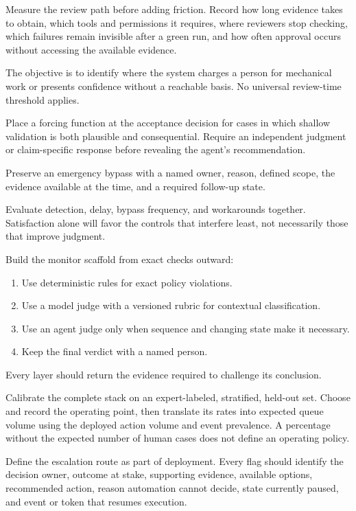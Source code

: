 Measure the review path before adding friction. Record how long evidence takes to obtain, which tools and permissions it requires, where reviewers stop checking, which failures remain invisible after a green run, and how often approval occurs without accessing the available evidence.

The objective is to identify where the system charges a person for mechanical work or presents confidence without a reachable basis. No universal review-time threshold applies.

Place a forcing function at the acceptance decision for cases in which shallow validation is both plausible and consequential. Require an independent judgment or claim-specific response before revealing the agent's recommendation.

Preserve an emergency bypass with a named owner, reason, defined scope, the evidence available at the time, and a required follow-up state.

Evaluate detection, delay, bypass frequency, and workarounds together. Satisfaction alone will favor the controls that interfere least, not necessarily those that improve judgment.


Build the monitor scaffold from exact checks outward:

\begin{enumerate}
\def\labelenumi{\arabic{enumi}.}
\tightlist
\item
  Use deterministic rules for exact policy violations.
\item
  Use a model judge with a versioned rubric for contextual classification.
\item
  Use an agent judge only when sequence and changing state make it necessary.
\item
  Keep the final verdict with a named person.
\end{enumerate}

Every layer should return the evidence required to challenge its conclusion.

Calibrate the complete stack on an expert-labeled, stratified, held-out set. Choose and record the operating point, then translate its rates into expected queue volume using the deployed action volume and event prevalence. A percentage without the expected number of human cases does not define an operating policy.

Define the escalation route as part of deployment. Every flag should identify the decision owner, outcome at stake, supporting evidence, available options, recommended action, reason automation cannot decide, state currently paused, and event or token that resumes execution.

